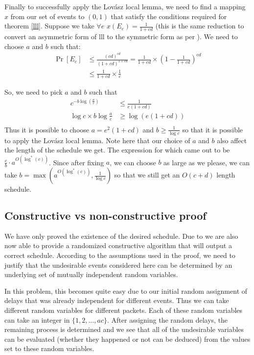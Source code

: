 Finally to successfully apply the Lov\'asz local lemma, we need to find a mapping $x$ from our set of events to $(0,1)$ that satisfy the conditions required for theorem \ref{lll}. Suppose we take $\forall e\,\, x(E_e) = \frac{1}{1+cd} $ (this is the same reduction to convert an asymmetric form of lll to the symmetric form as per \cite{assym}). We need to choose $a$ and $b$ such that:
\begin{equation*}
 \begin{align}
  \Pr[E_e] & \leq \frac{(cd)^{cd}}{(1+cd)^{1+cd} } = \frac{1}{1+cd}\times \left(1-\frac{1}{1+cd} \right)^{cd} \\
  & \leq \frac{1}{1+cd} \times \frac{1}{e}
 \end{align}
\end{equation*}

So, we need to pick $a$ and $b$ such that
\begin{equation*}
 \begin{align}
  c^{-b\log(\frac{a}{e})} & \leq \frac{1}{e(1+cd)} \\
  \log c \times b\log\frac{a}{e} & \geq \log (e(1+cd)) \\
 \end{align}
\end{equation*}
Thus it is possible to choose $a = e^2(1+cd) $ and $b\geq \frac{1}{\log c} $ so that it is possible to apply the Lov\'asz local lemma. Note here that our choice of $a$ and $b$ also affect the length of the schedule we get. The expression for which came out to be $\frac{c}{b}\cdot a^{O(\log^*(c)) }$. Since after fixing $a$, we can choose $b$ as large as we please, we can take $b = \max\left(a^{O(\log^*(c))},\frac{1}{\log c}\right) $ so that we still get an $O(c+d)$ length schedule.

\subsection{Constructive vs non-constructive proof}
We have only proved the existence of the desired schedule. Due to \cite{constructive} we are also now able to provide a randomized constructive algorithm that will output a correct schedule. According to the assumptions used in the proof, we need to justify that the undesirable events considered here can be determined by an underlying set of mutually independent random variables.

In this problem, this becomes quite easy due to our initial random assignment of delays that was already independent for different events. Thus we can take different random variables for different packets. Each of these random variables can take an integer in $\{1,2,\ldots,ac\}$. After assigning the random delays, the remaining process is determined and we see that all of the undesirable variables can be evaluated (whether they happened or not can be deduced) from the values set to these random variables.


